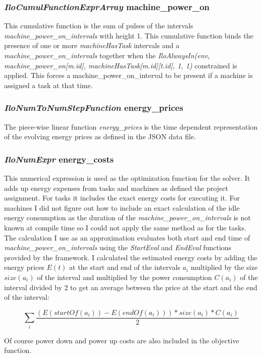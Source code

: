 \subsubsection{\textit{IloCumulFunctionExprArray} machine\_power\_on}

This cumulative function is the sum of pulses of the intervals \textit{machine\_power\_on\_intervals} with height 1.
This cumulative function binds the presence of one or more \textit{machineHasTask} intervals and a \textit{machine\_power\_on\_intervals} together when the \textit{IloAlwaysIn(env, machine\_power\_on[m.id], machineHasTask[m.id][t.id], 1, 1)} constrained is applied. This forces a machine\_power\_on\_interval to be present if a machine is assigned a task at that time. 

\subsubsection{\textit{IloNumToNumStepFunction} energy\_prices}

The piece-wise linear function \textit{energy\_prices} is the time dependent representation of the evolving energy prices as defined in the JSON data file.


\subsubsection{\textit{IloNumExpr} energy\_costs}
This numerical expression is used as the optimization function for the solver. It adds up energy expenses from tasks and machines as defined the project assignment. For tasks it includes the exact energy costs for executing it. For machines I did not figure out how to include an exact calculation of the idle energy consumption as the duration of the \textit{machine\_power\_on\_intervals} is not known at compile time so I could not apply the same method as for the tasks. The calculation I use as an approximation evaluates both start and end time of \textit{machine\_power\_on\_intervals} using the \textit{StartEval} and \textit{EndEval} functions provided by the framework. I calculated the estimated energy costs by adding the energy prices $E(t)$ at the start and end of the intervals $a_i$ multiplied by the size $size(a_i)$ of the interval and multiplied by the power consumption $C(a_i)$ of the interval divided by 2 to get an average between the price at the start and the end of the interval:

\[ \sum_i{\frac{(E(startOf(a_i)) - E(endOf(a_i)))*size(a_i)*C(a_i)}{2}} \]

Of course power down and power up costs are also included in the objective function.



